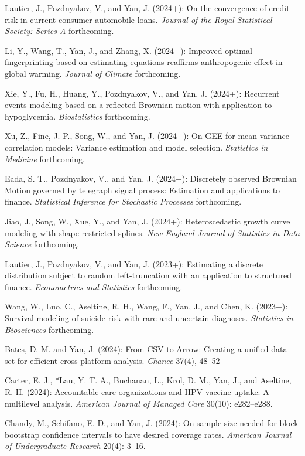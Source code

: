 \documentclass[Statistics]{vita}
\begin{document}
\begin{vita}
\begin{Publications}
\begin{RefereedJournalArticles}
  \item *Lautier, J., Pozdnyakov, V., and Yan, J. (2024+): On the convergence of credit risk in current consumer automobile loans. {\em Journal of the Royal Statistical Society: Series A\/} forthcoming.
  \item Li, Y., Wang, T., Yan, J., and Zhang, X. (2024+): Improved optimal fingerprinting based on estimating equations reaffirms anthropogenic effect in global warming. {\em Journal of Climate\/} forthcoming.
  \item *Xie, Y., Fu, H., Huang, Y., Pozdnyakov, V., and Yan, J. (2024+): Recurrent events modeling based on a reflected Brownian motion with application to hypoglycemia. {\em Biostatistics\/} forthcoming.
  \item *Xu, Z., Fine, J. P., Song, W., and Yan, J. (2024+): On GEE for mean-variance-correlation models: Variance estimation and model selection. {\em Statistics in Medicine\/} forthcoming.
  \item *Eada, S. T., Pozdnyakov, V., and Yan, J. (2024+): Discretely observed Brownian Motion governed by telegraph signal process: Estimation and applications to finance. {\em Statistical Inference for Stochastic Processes\/} forthcoming.
  \item *Jiao, J., Song, W., Xue, Y., and Yan, J. (2024+): Heteroscedastic growth curve modeling with shape-restricted splines. {\em New England Journal of Statistics in Data Science\/} forthcoming.
  \item *Lautier, J., Pozdnyakov, V., and Yan, J. (2023+): Estimating a discrete distribution subject to random left-truncation with an application to structured finance. {\em Econometrics and Statistics\/} forthcoming. 
  \item *Wang, W., Luo, C., Aseltine, R. H., Wang, F., Yan, J., and Chen, K. (2023+): Survival modeling of suicide risk with rare and uncertain diagnoses. {\em Statistics in Biosciences\/} forthcoming.
  \item Bates, D. M. and Yan, J. (2024): From CSV to Arrow: Creating a unified data set for efficient cross-platform analysis. {\em Chance\/} 37(4), 48–52
  \item Carter, E. J., *Lau, Y. T. A., Buchanan, L., Krol, D. M., Yan, J., and Aseltine, R. H. (2024): Accountable care organizations and {HPV} vaccine uptake: A multilevel analysis. {\em American Journal of Managed Care\/} 30(10): e282--e288.
  \item *Chandy, M., Schifano, E. D., and Yan, J. (2024): On sample size needed for block bootstrap confidence intervals to have desired coverage rates. {\em American Journal of Undergraduate Research\/} 20(4): 3--16.

\end{RefereedJournalArticles}
\end{Publications}
\end{vita}
\end{document}
